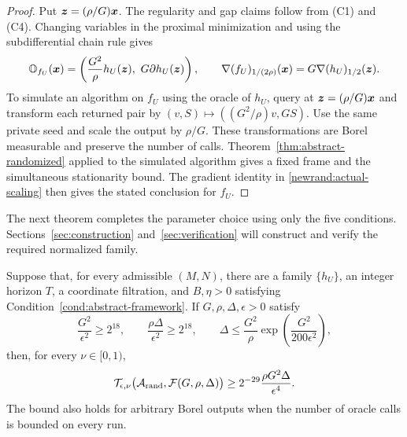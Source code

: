 \begin{proof}
Put $\bm{z}=(\rho/G)\bm{x}$.
The regularity and gap claims follow from \textnormal{(C1)} and
\textnormal{(C4)}. Changing variables in the proximal minimization
and using the subdifferential chain rule gives
\begin{equation}
 \mathbb O_{f_U}(\bm{x})
 =\left(\frac{G^2}{\rho}h_U(\bm{z}),\ G\partial h_U(\bm{z})\right),
 \qquad
 \nabla(f_U)_{1/(2\rho)}(\bm{x})
 =G\nabla(h_U)_{1/2}(\bm{z}).
 \label{newrand:actual-scaling}
\end{equation}
To simulate an algorithm on $f_U$ using the oracle of $h_U$,
query at $\bm{z}=(\rho/G)\bm{x}$ and transform each returned pair by
$(v,S)\mapsto((G^2/\rho)v,GS)$. Use the same private seed and
scale the output by $\rho/G$. These transformations are Borel
measurable and preserve the number of calls.
Theorem~\ref{thm:abstract-randomized} applied to the simulated
algorithm gives a fixed frame and the simultaneous stationarity
bound. The gradient identity in \eqref{newrand:actual-scaling}
then gives the stated conclusion for $f_U$.
\end{proof}

The next theorem completes the parameter choice using only the
five conditions. Sections~\ref{sec:construction}
and~\ref{sec:verification} will construct and verify the required
normalized family.

\begin{theorem}
\label{thm:scaling-reduction}
\label{newrand:main-range}
Suppose that, for every admissible $(M,N)$, there are a family
$\{h_U\}$, an integer horizon $T$, a coordinate filtration,
and $B,\eta>0$ satisfying Condition~\ref{cond:abstract-framework}.
If $G,\rho,\Delta,\epsilon>0$ satisfy
\[
 \frac{G^2}{\epsilon^2}\ge2^{18},\qquad
 \frac{\rho\Delta}{\epsilon^2}\ge2^{18},\qquad
 \Delta\le\frac{G^2}{\rho}
       \exp\!\left(\frac{G^2}{200\epsilon^2}\right),
\]
then, for every $\nu\in[0,1)$,
\begin{equation}
 {\cal T}_{\epsilon,\nu}
 \bigl({\cal A}_{\operatorname{rand}},{\cal F}(G,\rho,\Delta)\bigr)
 \ge 2^{-29}\frac{\rho G^2\Delta}{\epsilon^4}.
 \label{newrand:count}
\end{equation}
The bound also holds for arbitrary Borel outputs when the number
of oracle calls is bounded on every run.
\end{theorem}

